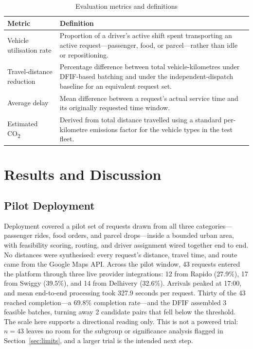\documentclass[conference]{IEEEtran}
\begin{document}
\begin{table}[t]
\caption{Evaluation metrics and definitions}
\label{tab:metrics}
\centering
\footnotesize
\setlength{\tabcolsep}{4pt}
\begin{tabular}{@{}p{}p{}@{}}
\toprule
Metric & Definition \\
\midrule
Vehicle utilisation rate &
Proportion of a driver's active shift spent transporting an active
request---passenger, food, or parcel---rather than idle or repositioning. \\
Travel-distance reduction &
Percentage difference between total vehicle-kilometres under DFIF-based
batching and under the independent-dispatch baseline for an equivalent
request set. \\
Average delay &
Mean difference between a request's actual service time and its originally
requested time window. \\
Estimated CO\textsubscript{2} &
Derived from total distance travelled using a standard per-kilometre
emissions factor for the vehicle types in the test fleet. \\
\bottomrule
\end{tabular}
\end{table}

\section{Results and Discussion}
\label{sec:results}

\subsection{Pilot Deployment}
Deployment covered a pilot set of requests drawn from all three
categories---passenger rides, food orders, and parcel drops---inside a bounded
urban area, with feasibility scoring, routing, and driver assignment wired
together end to end. No distances were synthesised: every request's distance,
travel time, and route came from the Google Maps API. Across the pilot window, 43 requests entered the platform through three live
provider integrations: 12 from Rapido (27.9\%), 17 from Swiggy (39.5\%), and
14 from Delhivery (32.6\%). Arrivals peaked at 17:00, and mean end-to-end
processing took 327.9 seconds per request. Thirty of the 43 reached
completion---a 69.8\% completion rate---and the DFIF assembled 3 feasible
batches, turning away 2 candidate pairs that fell below the threshold. The
scale here supports a directional reading only. This is not a powered trial:
$n=43$ leaves no room for the subgroup or significance analysis flagged in
Section~\ref{sec:limits}, and a larger trial is the intended next step.
\end{document}
